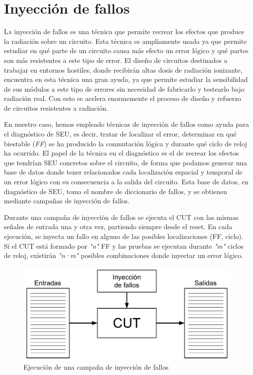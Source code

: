 \chapter{Inyección de fallos}
\label{ch:InyeccionDeFallos}

\lettrine[lraise=-0.1, lines=2, loversize=0.2]{L}{a} inyección de fallos es una
técnica que permite recrear los efectos que produce la radiación sobre un
circuito. Esta técnica es ampliamente usada ya que permite estudiar en qué parte
de un circuito causa más efecto un error lógico y qué partes son más resistentes a
este tipo de error. El diseño de circuitos destinados a trabajar en entornos 
hostiles, donde recibirán altas dosis de radiación ionizante, encuentra en esta
técnica una gran ayuda, ya que permite estudiar la sensibilidad de sus módulos a
este tipo de errores sin necesidad de fabricarlo y testearlo bajo radiación real.
Con esto se acelera enormemente el proceso de diseño y refuerzo de circuitos
resistentes a radiación.

En nuestro caso, hemos empleado técnicas de inyección de fallos como ayuda para el
diagnóstico de \gls{SEU}, es decir, tratar de localizar el error, determinar en 
qué biestable (\textit{\gls{FF}}) se ha producido la conmutación lógica y durante
qué ciclo de reloj ha ocurrido. El papel de la técnica en el diagnóstico es el de
recrear los efectos que tendrían \gls{SEU} concretos sobre el circuito, de forma
que podamos generar una base de datos donde tener relacionados cada localización
espacial y temporal de un error lógico con su consecuencia a la salida del
circuito. Esta base de datos, en diagnóstico de \gls{SEU}, toma el nombre de
diccionario de fallos, y se obtienen mediante campañas de inyección de fallos.

Durante una campaña de inyección de fallos se ejecuta el \gls{CUT} con las mismas
señales de entrada una y otra vez, partiendo siempre desde el reset. En cada
ejecución, se inyecta un fallo en alguno de las posibles localizaciones (\gls{FF}, 
ciclo). Si el \gls{CUT} está formado por \textit{"n"} \gls{FF} y las pruebas se 
ejecutan durante \textit{"m"} ciclos de reloj, existirán \textit{"n·m"} posibles 
combinaciones donde inyectar un error lógico.

\begin{figure}[htbp]
    \centering
    \includegraphics[width=0.95\linewidth]
    {InyeccionDeFallos/figuras/fig31.pdf}
    \caption{Ejecución de una campaña de inyección de fallos}
    \label{fig:Inyeccion}
\end{figure}

